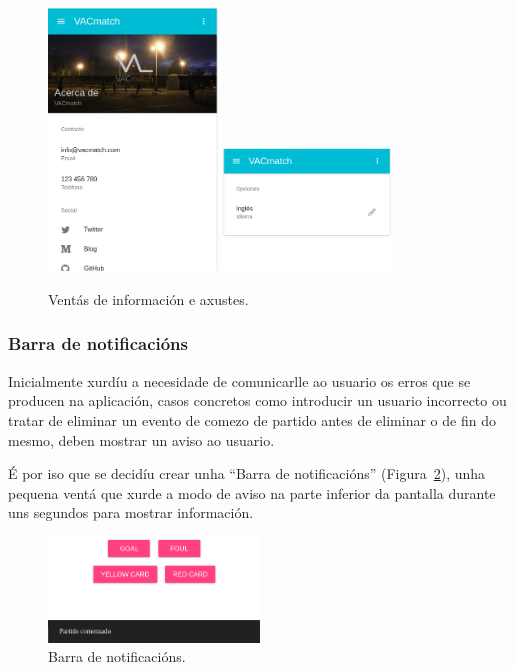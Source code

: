       \begin{figure}[h!]
        \begin{center}
        \includegraphics[width=0.4\textwidth]{./img/demo/3_about.png}
        \includegraphics[width=0.4\textwidth]{./img/demo/4_settings.png}
        \caption{Ventás de información e axustes.}
        \label{fig:design:settings}
        \end{center}
      \end{figure}

      \subsubsection{Barra de notificacións}
      Inicialmente xurdíu a necesidade de comunicarlle ao usuario os erros que 
se producen na aplicación, casos concretos como introducir un usuario 
incorrecto ou tratar de eliminar un evento de comezo de partido antes de 
eliminar o de fin do mesmo, deben mostrar un aviso ao usuario.

      É por iso que se decidíu crear unha ``Barra de notificacións'' 
(Figura~\ref{fig:design:notifications}), unha 
pequena ventá que xurde a modo de aviso na parte inferior da pantalla durante 
uns segundos para mostrar información.

      \begin{figure}[h!]
        \begin{center}
        \includegraphics[width=0.5\textwidth]{./img/demo/5_notifications.png}
        \caption{Barra de notificacións.}
        \label{fig:design:notifications}
        \end{center}
      \end{figure}


